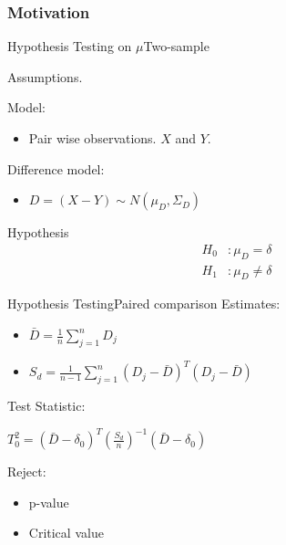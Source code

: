 \documentclass[aspectratio=169,10pt,t]{beamer}
\begin{document}
\begin{frame}[t]
	\frametitle{Motivation}

\end{frame}

\begin{frame}{Hypothesis Testing on $\mu$}{Two-sample}

	Assumptions.

	Model:
	\begin{itemize}
		\item Pair wise observations. $X$ and $Y$.
	\end{itemize}

	Difference model:
	\begin{itemize}
		\item 
			$ D =   \left( X - Y  \right)  \sim N \left( \mu_D, \Sigma_D  \right)  $
	\end{itemize}

	Hypothesis
	\begin{align*}
		H_0&: \mu_D = \delta\\
		H_1&: \mu_D \neq \delta
	\end{align*}

\end{frame}

\begin{frame}{Hypothesis Testing}{Paired comparison}
	Estimates: \\
	\begin{itemize}
		\item $\bar{D} = \frac{1}{n} \sum^n_{j=1} D_j$ 
		\item $S_d = \frac{1}{n-1} \sum^n_{j=1} \left(D_j - \bar{D} \right)^T \left(D_j - \bar{D} \right)$ 
	\end{itemize}
	Test Statistic: \\
	\begin{center}
		\quad $T_0^2 = \left( \bar{D} - \delta_0 \right)^T \left( \frac{S_d}{n}  \right) ^{-1} \left( \bar{D} - \delta_0 \right)$ \\
	\end{center}
	Reject: \\
	\begin{itemize}
		\item p-value
		\item Critical value
	\end{itemize}
\end{frame}
\end{document}
